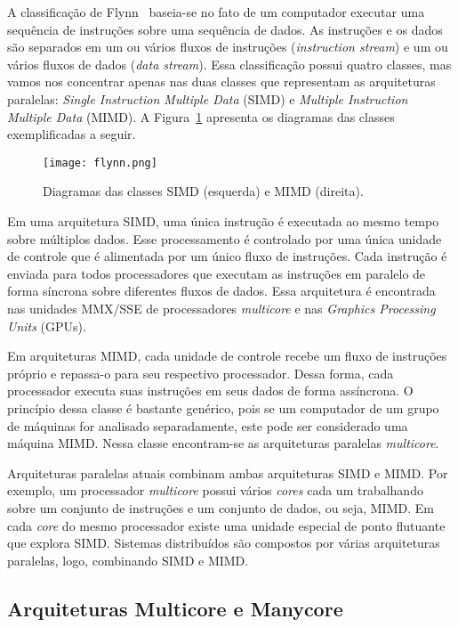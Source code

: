 A classificação de Flynn~\cite{flynn1996parallel} baseia-se no fato de um computador executar uma sequência de instruções sobre uma sequência de dados. As instruções e os dados são separados em um ou vários fluxos de instruções (\textit{instruction stream}) e um ou vários fluxos de dados (\textit{data stream}). Essa classificação possui quatro classes, mas vamos nos concentrar apenas nas duas classes que representam as arquiteturas paralelas: \textit{Single Instruction Multiple Data} (SIMD) e \textit{Multiple Instruction Multiple Data} (MIMD). A Figura~\ref{fig:simd_mimd} apresenta os diagramas das classes exemplificadas a seguir.

\begin{figure}[!htb]
	\centering
	\caption{Diagramas das classes SIMD (esquerda) e MIMD (direita).}
	\label{fig:simd_mimd}
	\texttt{[image: flynn.png]}
\end{figure}

Em uma arquitetura SIMD, uma única instrução é executada ao mesmo tempo sobre múltiplos dados. Esse processamento é controlado por uma única unidade de controle que é alimentada por um único fluxo de instruções. Cada instrução é enviada para todos processadores que executam as instruções em paralelo de forma síncrona sobre diferentes fluxos de dados. Essa arquitetura é encontrada nas unidades MMX/SSE de processadores \textit{multicore} e nas \textit{Graphics Processing Units} (GPUs).

Em arquiteturas MIMD, cada unidade de controle recebe um fluxo de instruções próprio e repassa-o para seu respectivo processador. Dessa forma, cada processador executa suas instruções em seus dados de forma assíncrona. O princípio dessa classe é bastante genérico, pois se um computador de um grupo de máquinas for analisado separadamente, este pode ser considerado uma máquina MIMD. Nessa classe encontram-se as arquiteturas paralelas \textit{multicore}.

Arquiteturas paralelas atuais combinam ambas arquiteturas SIMD e MIMD. Por exemplo, um processador \textit{multicore} possui vários \textit{cores} cada um trabalhando sobre um conjunto de instruções e um conjunto de dados, ou seja, MIMD. Em cada \textit{core} do mesmo processador existe uma unidade especial de ponto flutuante que explora SIMD. Sistemas distribuídos são compostos por várias arquiteturas paralelas, logo, combinando SIMD e MIMD.

\subsection{Arquiteturas Multicore e Manycore}

